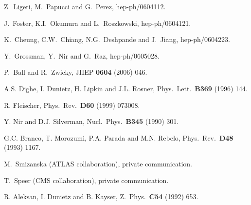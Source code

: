 \documentclass[11pt]{cernrep}
\begin{document}
\begin{thebibliography}{999}
Z.~Ligeti, M.~Papucci and G.~Perez,
  hep-ph/0604112.
  
J.~Foster, K.I.~Okumura and L.~Roszkowski,
  hep-ph/0604121.
  
K.~Cheung, C.W.~Chiang, N.G.~Deshpande and J.~Jiang,
  hep-ph/0604223.
  
Y.~Grossman, Y.~Nir and G.~Raz,
  hep-ph/0605028.
  
P.~Ball and R.~Zwicky,
 { JHEP} {\bf 0604} (2006) 046.

A.S. Dighe, I. Dunietz, H. Lipkin and J.L. Rosner,
  { Phys.\ Lett.}~{\bf B369} (1996) 144.

R. Fleischer,
  { Phys.\ Rev.}~{\bf D60} (1999) 073008.
  
Y. Nir and D.J. Silverman,
  { Nucl.\ Phys.}~{\bf B345} (1990) 301.

G.C. Branco, T. Morozumi, P.A. Parada and M.N. Rebelo,
 { Phys.\ Rev.}~{\bf D48} (1993) 1167.
  
M.~Smizanska (ATLAS collaboration), private communication.

T.~Speer (CMS collaboration), private communication.

R. Aleksan, I. Dunietz and B. Kayser,
{ Z.\ Phys.}~{\bf C54} (1992) 653.


\end{thebibliography}
\end{document}
